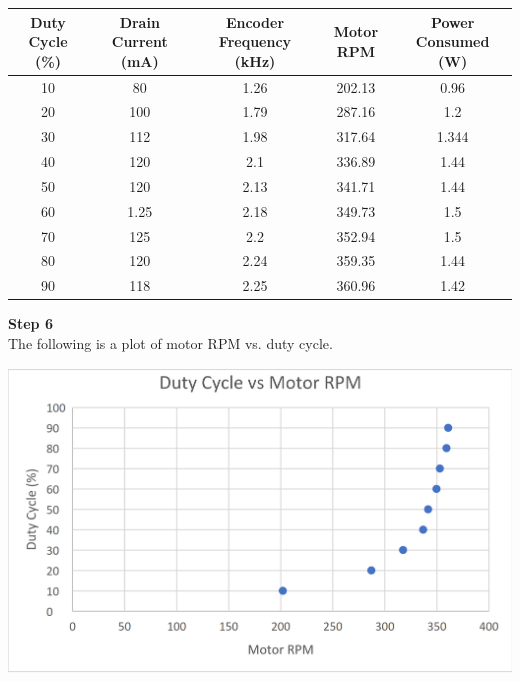 \documentclass[notitlepage, 12pt]{report}  %
\begin{document}
\begin{table}[h!]
    \begin{center}
    \begin{tabular}{c|c|c|c|c}
    Duty Cycle (\%) & Drain Current (mA) & Encoder Frequency (kHz) & Motor RPM & Power Consumed (W) \\ \hline
    10              & 80                 & 1.26                    & 202.13    & 0.96               \\
    20              & 100                & 1.79                    & 287.16    & 1.2                \\
    30              & 112                & 1.98                    & 317.64    & 1.344              \\
    40              & 120                & 2.1                     & 336.89    & 1.44               \\
    50              & 120                & 2.13                    & 341.71    & 1.44               \\
    60              & 1.25               & 2.18                    & 349.73    & 1.5                \\
    70              & 125                & 2.2                     & 352.94    & 1.5                \\
    80              & 120                & 2.24                    & 359.35    & 1.44               \\
    90              & 118                & 2.25                    & 360.96    & 1.42              
    \end{tabular}
    \end{center}
\end{table}

\newpage

\textbf{Step 6}\\

The following is a plot of motor RPM vs. duty cycle. \\

\begin{center}
    \includegraphics[scale=0.2]{plot.png}
\end{center}
\end{document}
